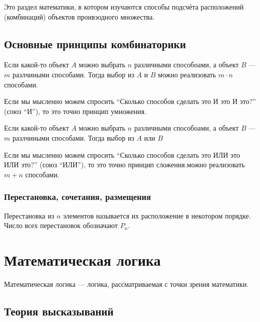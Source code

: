 \begin{definition}[Комбинаторика]
	Это раздел математики, в котором изучаются способы подсчёта
	расположений (комбинаций) объектов проивзодного множества.
\end{definition}

\section{Основные принципы комбинаторики}

\begin{definition}
	Если какой-то объект $A$ можно выбрать $n$ различными способоами, а
	объект $B$ --- $m$ разлчиными способами. Тогда выбор из $A$ и $B$
	можно реализовать $m \cdot n$ способами.

	Если мы мысленно можем спросить ``Сколько способов сделать это И это
	И это?'' (союз ``И''), то это точно принцип умножения.
\end{definition}

\begin{definition}
	Если какой-то объект $A$ можно выбрать $n$ различными способоами, а
	объект $B$ --- $m$ разлчиными способами. Тогда выбор из $A$ или $B$

	Если мы мысленно можем спросить ``Сколько способов сделать это ИЛИ
	это ИЛИ это?'' (союз ``ИЛИ''), то это точно принцип сложения.можно
	реализовать $m + n$ способами.
\end{definition}

\subsection{Перестановка, сочетания, размещения}

\begin{definition}[Перестановка]
	Перестановка из $n$ элементов называется их расположение в
	некотором порядке. Число всех перестановок обозначают $P_n$.
\end{definition}

\chapter{Математическая логика}

Математическая логика --- логика, рассматриваемая с точки зрения математики.

\section{Теория высказываний}

